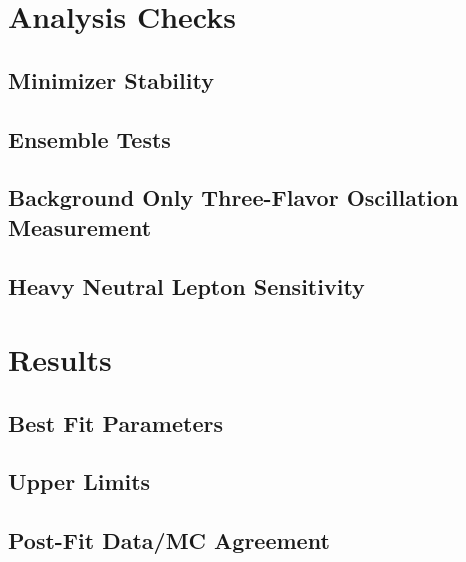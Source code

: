 \section{Analysis Checks}

\subsection{Minimizer Stability}

\subsection{Ensemble Tests}

\subsection{Background Only Three-Flavor Oscillation Measurement}

\subsection{Heavy Neutral Lepton Sensitivity}



\section{Results}

\subsection{Best Fit Parameters}

\subsection{Upper Limits}

\subsection{Post-Fit Data/MC Agreement}

